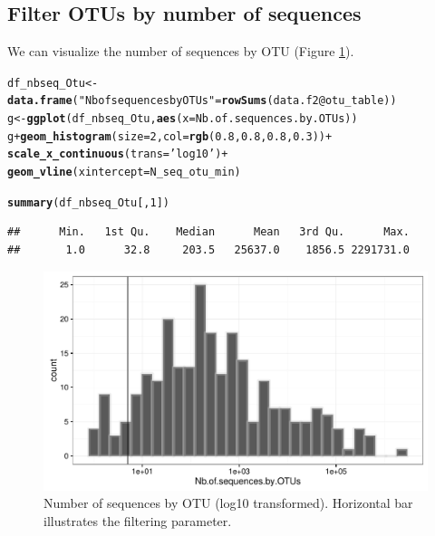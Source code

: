 \documentclass[12pt]{article}\usepackage[]{graphicx}\usepackage[]{color}
\makeatletter
\def\maxwidth{ %
  \ifdim\Gin@nat@width>\linewidth
    \linewidth
  \else
    \Gin@nat@width
  \fi
}
\newcommand{\hlnum}[1]{\textcolor[rgb]{0.686,0.059,0.569}{#1}}%
\newcommand{\hlstr}[1]{\textcolor[rgb]{0.192,0.494,0.8}{#1}}%
\newcommand{\hlopt}[1]{\textcolor[rgb]{0,0,0}{#1}}%
\newcommand{\hlstd}[1]{\textcolor[rgb]{0.345,0.345,0.345}{#1}}%
\newcommand{\hlkwb}[1]{\textcolor[rgb]{0.69,0.353,0.396}{#1}}%
\newcommand{\hlkwc}[1]{\textcolor[rgb]{0.333,0.667,0.333}{#1}}%
\newcommand{\hlkwd}[1]{\textcolor[rgb]{0.737,0.353,0.396}{\textbf{#1}}}%
\newenvironment{kframe}{%
 \def\at@end@of@kframe{}%
 \ifinner\ifhmode%
  \def\at@end@of@kframe{\end{minipage}}%
  \begin{minipage}{\columnwidth}%
 \fi\fi%
 \def\FrameCommand##1{\hskip\@totalleftmargin \hskip-\fboxsep
 \colorbox{shadecolor}{##1}\hskip-\fboxsep
     \hskip-\linewidth \hskip-\@totalleftmargin \hskip\columnwidth}%
 \MakeFramed {\advance\hsize-\width
   \@totalleftmargin\z@ \linewidth\hsize
   \@setminipage}}%
 {\par\unskip\endMakeFramed%
 \at@end@of@kframe}
\newenvironment{knitrout}{}{} %
\numberwithin{figure}{section}
\makeatother
\begin{document}
 \subsection{Filter OTUs by number of sequences}

 We can visualize the number of sequences by OTU (Figure \ref{fig:nbseq_Otu}).

\begin{knitrout}\small
{}\color{fgcolor}\begin{kframe}
\begin{alltt}
\hlstd{df_nbseq_Otu} \hlkwb{<-} \hlkwd{data.frame}\hlstd{(}\hlstr{"Nb of sequences by OTUs"} \hlstd{=} \hlkwd{rowSums}\hlstd{(data.f2}\hlopt{@}\hlkwc{otu_table}\hlstd{))}
\hlstd{g} \hlkwb{<-} \hlkwd{ggplot}\hlstd{(df_nbseq_Otu,} \hlkwd{aes}\hlstd{(}\hlkwc{x} \hlstd{= Nb.of.sequences.by.OTUs))}
\hlstd{g} \hlopt{+} \hlkwd{geom_histogram}\hlstd{(}\hlkwc{size} \hlstd{=} \hlnum{2}\hlstd{,} \hlkwc{col} \hlstd{=} \hlkwd{rgb}\hlstd{(}\hlnum{0.8}\hlstd{,} \hlnum{0.8}\hlstd{,} \hlnum{0.8}\hlstd{,} \hlnum{0.3}\hlstd{))} \hlopt{+}
  \hlkwd{scale_x_continuous}\hlstd{(}\hlkwc{trans} \hlstd{=} \hlstr{'log10'}\hlstd{)} \hlopt{+}
  \hlkwd{geom_vline}\hlstd{(}\hlkwc{xintercept}\hlstd{= N_seq_otu_min)}
\end{alltt}


{\ttfamily\noindent\itshape\color{messagecolor}{\#\# `stat\_bin()` using `bins = 30`. Pick better value with `binwidth`.}}\begin{alltt}
\hlkwd{summary}\hlstd{(df_nbseq_Otu[,} \hlnum{1}\hlstd{])}
\end{alltt}
\begin{verbatim}
##      Min.   1st Qu.    Median      Mean   3rd Qu.      Max. 
##       1.0      32.8     203.5   25637.0    1856.5 2291731.0
\end{verbatim}
\end{kframe}\begin{figure}

{\centering \includegraphics[width=\maxwidth]{figure/nbseq_Otu-1} 

}

\caption[Number of sequences by OTU (log10 transformed)]{Number of sequences by OTU (log10 transformed). Horizontal bar illustrates the filtering parameter.}\label{fig:nbseq_Otu}
\end{figure}


\end{knitrout}
\end{document}
